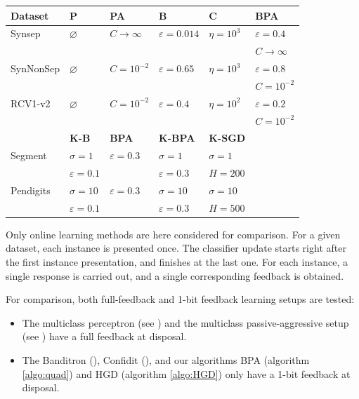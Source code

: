 \documentclass[preprint,12pt,authoryear]{elsarticle}
\begin{document}
\begin{table}[h]
\begin{center}
\begin{tabular}{llllll}
			\hline
			{\bf Dataset}  & {\bf P} & {\bf PA } & {\bf B}& {\bf C} & {\bf BPA}\\
			\hline
			Synsep & $\varnothing$ & $C\rightarrow\infty$ & $\varepsilon = 0.014$ &$\eta = 10^3$ & $\varepsilon = 0.4$\\
			&&&&& $C \rightarrow \infty$\\
			
			SynNonSep & $\varnothing$ & $C=10^{-2}$ & $\varepsilon =0.65$ & $\eta = 10^3$& $\varepsilon = 0.8$\\
			&&&&& $C = 10^{-2}$\\			
			RCV1-v2 & $\varnothing$ & $C=10^{-2}$ & $\varepsilon =0.4$ & $\eta = 10^2$ & $\varepsilon = 0.2$\\
			&&&&& $C = 10^{-2}$\\
			\hline
			&{\bf K-B} & {\bf BPA} & {\bf K-BPA} &{\bf K-SGD}\\
			\hline
			Segment & $\sigma = 1$ & $\varepsilon = 0.3$ & $\sigma = 1$ &$\sigma = 1$\\
			&$\varepsilon =0.1$&&$\varepsilon = 0.3$ & $H = 200$\\
			Pendigits & $\sigma = 10$ & $\varepsilon = 0.3$ &$\sigma = 10$&$\sigma = 10$\\
			&$\varepsilon =0.1$&& $\varepsilon = 0.3$ & $H = 500$\\
			
			
		\end{tabular}	
	\end{center}
\end{table}


Only  online learning methods are here considered for comparison. For a given dataset, each instance is presented once. The classifier update starts right after the first instance presentation, and finishes at the last one. For each instance, a single response is carried out, and a single corresponding feedback is obtained.

For comparison, both full-feedback and 1-bit feedback learning setups are tested:
\begin{itemize}
	\item The multiclass perceptron (see \cite{duda1973pattern}) and the multiclass passive-aggressive setup (see  \cite{crammer2006online}) have a full feedback at disposal.
	\item The Banditron (\cite{kakade2008efficient}), Confidit (\cite{crammer2013multiclass}), and our algorithms BPA (algorithm \ref{algo:quad}) and HGD (algorithm \ref{algo:HGD}) only have a 1-bit feedback at disposal.
\end{itemize} 
\end{document}
